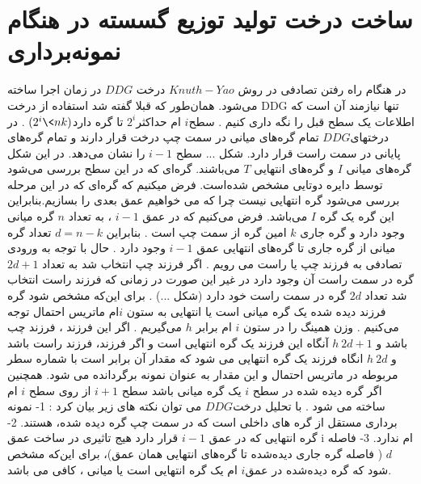 \section{ساخت درخت تولید توزیع گسسته در هنگام نمونه‌برداری}
در هنگام راه رفتن تصادفی در روش $Knuth-Yao$ درخت $DDG $ در زمان اجرا ساخته می‌شود. همان‌طور که قبلا گفته شد استفاده از درخت DDG  تنها نیازمند آن است که اطلاعات یک سطح قبل را نگه داری کنیم . سطح$ i$ ام حداکثر$2^{i}$ تا گره دارد$(2^{i} \< nk)$  . در درختهای$ DDG$ تمام گره‌های میانی در سمت چپ درخت قرار دارند و تمام گره‌های پایانی در سمت راست قرار دارد.  شکل ... سطح $ i - 1$  را نشان می‌دهد. در این شکل گره‌های میانی $I$  و گره‌های انتهایی $T$  می‌باشند. گره‌ای که در این سطح بررسی می‌شود توسط دایره دوتایی مشخص شده‌است. فرض میکنیم که گره‌ای که در این مرحله  بررسی می‌شود گره انتهایی نیست چرا که می خواهیم عمق بعدی را بسازیم.بنابراین این گره یک گره $I$ می‌باشد. فرض می‌کنیم که در عمق $i - 1$  ،  به تعداد $n $ گره میانی وجود دارد و گره جاری $k$  امین گره از سمت چپ است . بنابراین $d= n - k$ تعداد گره میانی از گره جاری تا گره‌های انتهایی عمق $i - 1$ وجود دارد . حال با توجه به ورودی تصادفی به فرزند چپ یا راست می رویم . اگر فرزند چپ انتخاب شد به تعداد $2d + 1$ گره در سمت راست آن وجود دارد در غیر این صورت در زمانی که فرزند راست انتخاب شد تعداد $2d$  گره در سمت راست خود دارد (شکل ...) . برای این‌که مشخص شود گره فرزند دیده شده یک گره میانی است یا انتهایی به ستون $i $ام ماتریس احتمال توجه می‌کنیم . وزن همینگ را در ستون $i$  ام برابر $h$  می‌گیریم . اگر این فرزند ، فرزند چب باشد و $h\>  2d+ 1$ آنگاه این فرزند یک گره انتهایی است و اگر   فرزند، فرزند راست باشد و $h\> 2d$  انگاه فرزند یک گره انتهایی می شود که مقدار آن برابر است با  شماره سطر مربوطه در ماتریس احتمال و این مقدار به عنوان نمونه برگردانده می شود. همچنین اگر گره دیده شده در سطح $i$ یک گره میانی باشد  سطح $ i + 1$  از روی سطح $ i $ ام  ساخته می شود . 
با تحلیل درخت$ DDG $ می توان نکته های زیر بیان کرد :
1- نمونه برداری مستقل از گره های داخلی است  که در سمت چپ گره دیده شده، هستند. 
2- گره انتهایی که در عمق $i - 1$  قرار دارد هیج تاثیری در ساخت عمق i  ام ندارد. 
3- فاصله $d$ ( فاصله گره جاری دیده‌شده تا گره‌های انتهایی همان عمق)،  برای این‌که مشخص شود که گره دیده‌شده در عمق$ i$  ام  یک گره انتهایی است یا میانی ، کافی می باشد. 



